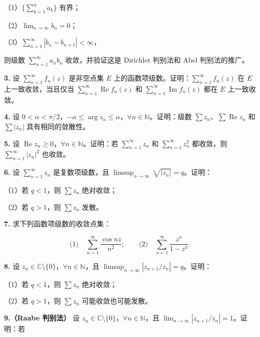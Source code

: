 \documentclass[11pt,a4paper]{article}
\begin{document}
（1）\(\{\sum_{k=1}^n a_k\}\) 有界；

（2）\(\lim_{n\to\infty}b_n=0\)；

（3）\(\sum_{n=1}^{\infty}|b_n-b_{n+1}|<\infty\)，

则级数 \(\sum_{n=1}^{\infty}a_nb_n\) 收敛，并验证这是 Dirichlet 判别法和
Abel 判别法的推广。

\par{}
\noindent\textbf{3.} 设 \(\sum_{n=1}^{\infty}f_n(z)\) 是非空点集 \(E\)
上的函数项级数。证明：\(\sum_{n=1}^{\infty}f_n(z)\) 在 \(E\)
上一致收敛，当且仅当 \(\sum_{n=1}^{\infty}\operatorname{Re}f_n(z)\) 和
\(\sum_{n=1}^{\infty}\operatorname{Im}f_n(z)\) 都在 \(E\) 上一致收敛。

\par{}
\noindent\textbf{4.} 设
\(0<\alpha<\pi/2\)，\(-\alpha\le\arg z_n\le\alpha\)，\(\forall n\in\mathbb N\)。证明：级数
\(\sum z_n\)、\(\sum\operatorname{Re}z_n\) 和 \(\sum|z_n|\)
具有相同的敛散性。

\par{}
\noindent\textbf{5.} 设
\(\operatorname{Re}z_n\ge0\)，\(\forall n\in\mathbb N\)。证明：若
\(\sum_{n=1}^{\infty}z_n\) 和 \(\sum_{n=1}^{\infty}z_n^2\) 都收敛，则
\(\sum_{n=1}^{\infty}|z_n|^2\) 也收敛。

\par{}
\noindent\textbf{6.} 设 \(\sum_{n=1}^{\infty}z_n\) 是复数项级数，且
\(\limsup_{n\to\infty}\sqrt[n]{|z_n|}=q\)。证明：

（1）若 \(q<1\)，则 \(\sum z_n\) 绝对收敛；

（2）若 \(q>1\)，则 \(\sum z_n\) 发散。

\par{}
\noindent\textbf{7.} 求下列函数项级数的收敛点集：

\[
\text{(1)}\quad\sum_{n=1}^{\infty}\frac{\cos nz}{n^2};
\qquad
\text{(2)}\quad\sum_{n=1}^{\infty}\frac{z^n}{1-z^n}.
\]

\par{}
\noindent\textbf{8.} 设
\(z_n\in\mathbb C\setminus\{0\}\)，\(\forall n\in\mathbb N\)，且
\(\limsup_{n\to\infty}|z_{n+1}/z_n|=q\)。证明：

（1）若 \(q<1\)，则 \(\sum z_n\) 绝对收敛；

（2）若 \(q>1\)，则 \(\sum z_n\) 可能收敛也可能发散。

\textbf{9.（Raabe 判别法）} 设
\(z_n\in\mathbb C\setminus\{0\}\)，\(\forall n\in\mathbb N\)，且
\(\lim_{n\to\infty}|z_{n+1}/z_n|=1\)。证明：若
\end{document}
